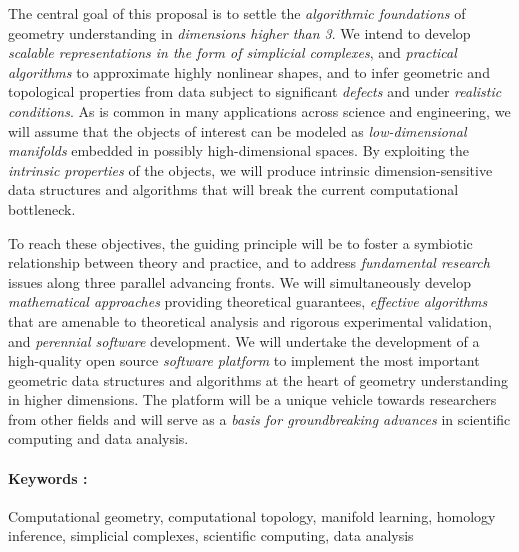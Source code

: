 
The central goal of this proposal is to settle the {\em algorithmic
foundations} of geometry understanding in {\em dimensions higher than
3}.  We intend to develop {\em scalable representations  in the form of simplicial complexes}, and {\em
practical algorithms} to approximate highly nonlinear shapes, and to
infer geometric and topological properties from data subject to
significant {\em defects} and under {\em realistic conditions}.
As is common in many applications across science and engineering, we
will assume that the objects of interest can be modeled as {\em
  low-dimensional manifolds} embedded in possibly high-dimensional
spaces. By exploiting the {\em intrinsic properties} of the objects,
we will produce intrinsic dimension-sensitive data structures and algorithms
that will break the current computational
bottleneck.

To reach these objectives, the guiding principle will be to foster a
symbiotic relationship between theory and practice, and to address
{\em fundamental research} issues along three parallel advancing
fronts. We will simultaneously develop {\em mathematical approaches}
providing theoretical guarantees, {\em effective algorithms} that are
amenable to theoretical analysis and rigorous experimental validation,
and {\em perennial software} development.  We will undertake the
development of a high-quality open source {\em software platform} to
implement the most important geometric data structures and algorithms
at the heart of geometry understanding in higher dimensions. The
platform will be a unique vehicle towards researchers from other
fields and will serve as a {\em basis for groundbreaking advances} in
scientific computing and data analysis.



\paragraph{Keywords :} Computational geometry, computational topology,
manifold learning, homology inference, simplicial complexes,
scientific computing, data analysis